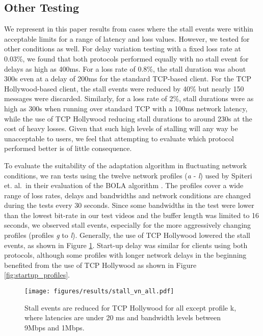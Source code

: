 \subsection{Other Testing}
\label{sec:other_testing}

We represent in this paper results from cases where the stall events were within
acceptable limits for a range of latency and loss values. However, we tested for other
conditions as well. For delay variation testing with a fixed loss rate at 0.03\%, we found
that both protocols performed equally with no stall event for delays as high as 400ms. For
a loss rate of 0.8\%, the stall duration was about 300s even at a delay of 200ms for the
standard TCP-based client. For the TCP Hollywood-based client, the stall events were reduced 
by 40\% but nearly 150
messages were discarded. Similarly, for a loss rate of 2\%, stall durations were as high as
300s when running over standard TCP with a 100ms network latency, while the use of 
TCP Hollywood reducing stall durations 
to around 230s at the cost of heavy losses. Given that such high levels of stalling will
any way be unacceptable to users, we feel that attempting to evaluate which protocol
performed better is of little consequence.

To evaluate the suitability of the adaptation algorithm in fluctuating network conditions,
we ran tests using the twelve network profiles (\emph{a} - \emph{l}) used by Spiteri et.
al.\ in their evaluation of the BOLA algorithm \cite{spiteri2016bola}. The profiles cover a
wide range of loss rates, delays and bandwidths and network conditions are changed during
the tests every 30 seconds. Since some bandwidths in the test were lower than the lowest
bit-rate in our test videos and the buffer length was limited to 16 seconds, we observed
stall events, especially for the more aggressively changing profiles (profiles \emph{g} to
\emph{l}). Generally, the use of TCP Hollywood lowered the stall events, as shown in Figure
\ref{fig:stall_profiles}. Start-up delay was similar for clients using both protocols,
although some profiles with longer network delays in the beginning benefited from the use of TCP Hollywood as shown in Figure \ref{fig:startup_profiles}.

\begin{figure}
  \centering
  \texttt{[image: figures/results/stall\_vn\_all.pdf]}
  \caption{Stall events are reduced for TCP Hollywood for all except profile k, where 
           latencies are under 20 ms and bandwidth levels between 9Mbps and 1Mbps. }
  \label{fig:stall_profiles}
\end{figure}

